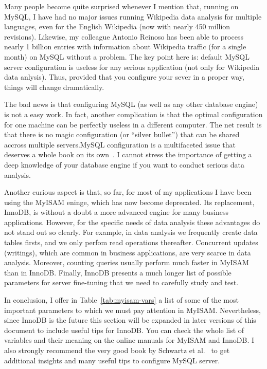 Many people become quite surprised whenever I mention that, running on MySQL, I have
had no major issues running Wikipedia data analysis for multiple languages, even
for the English Wikipedia (now with nearly 450 million revisions). Likewise, my
colleague Antonio Reinoso has been able to process nearly 1 billion entries with
information about Wikipedia traffic (for a single month) on MySQL without a problem.
The key point here is: default MySQL server configuration is useless for any
serious application (not only for Wikipedia data anlysis). Thus, provided that you
configure your sever in a proper way, things will change dramatically.

The bad news is that configuring MySQL (as well as any other database engine) is
not a easy work. In fact, another complication is that the optimal configuration
for one machine can be perfectly useless in a different computer. The net result
is that there is no magic configuration (or ``silver bullet'') that can be shared
accross multiple servers.MySQL configuration is a multifaceted issue
that deserves a whole book on its own~\cite{Schwartz2012}.
I cannot stress the importance of getting a deep knowledge of your database engine
if you want to conduct serious data analysis.

Another curious aspect is that, so far, for most of my applications I have been 
using the MyISAM eninge, which has now become deprecated. Its replacement, InnoDB,
is without a doubt a more advanced engine for many business applications. However,
for the specific needs of data analysis these advantages do not stand out so clearly.
For example, in data analysis we frequently create data tables firsts, and we only
perfom read operations thereafter. Concurrent updates (writings), which are common
in business applications, are very scarce in data analysis. Moreover, counting
queries usually perform much faster in MyISAM than in InnoDB. Finally, InnoDB presents
a much longer list of possible parameters for server fine-tuning that we need
to carefully study and test.

In conclusion, I offer in Table~\ref{tab:myisam-vars} a list of some of the most important parameters
to which we must pay attention in MyISAM. Nevertheless, since InnoDB is the future
this section will be expanded in later versions of this document to include useful
tips for InnoDB. You can check the whole list of variables and their meaning
on the online manuals for MyISAM and InnoDB. I also strongly recommend the very
good book by Schwartz et al.~\cite{Schwartz2012} to get additional insights and many
useful tips to configure MySQL server.

